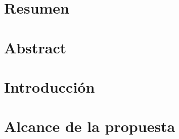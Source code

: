 \documentclass[letterpaper, 11pt, oneside]{book}
\begin{document}
\renewcommand{\tablename}{Tabla}

\portada


\contraportada



\clearpage
\pagestyle{plain}  
\setcounter{page}{1}  



\cleardoublepage
\renewcommand\contentsname{\centering Tabla de Contenido}
\tableofcontents

\cleardoublepage
\renewcommand{\listfigurename}{\centering Lista de Figuras}
\listoffigures 

\cleardoublepage
\renewcommand{\listtablename}{\centering Lista de tablas}
\listoftables


\chapter*{Resumen}

\thispagestyle{empty}

\chapter*{Abstract}


\cleardoublepage
{}
\setcounter{page}{1}

\chapter{Introducción}







\chapter{Alcance de la propuesta}

\end{document}
